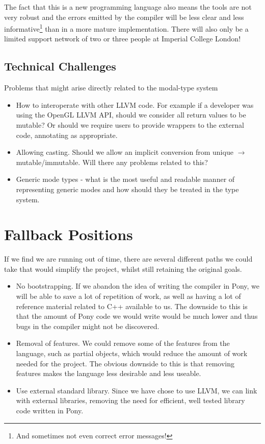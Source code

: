 \documentclass[pdftex,11pt,a4paper]{report}
\begin{document}
The fact that this is a new programming language also means the tools are not very robust and the errors emitted by the compiler will be less clear and less informative\footnote{And sometimes not even correct error messages!} than in a more mature implementation.
There will also only be a limited support network of two or three people at Imperial College London!

\subsection{Technical Challenges}

Problems that might arise directly related to the modal-type system
	\begin{itemize}
		\item How to interoperate with other LLVM code. For example if a developer was using the OpenGL LLVM API, should we consider all return values to be mutable?
			Or should we require users to provide wrappers to the external code, annotating as appropriate.
		\item Allowing casting. Should we allow an implicit conversion from unique $\to$ mutable/immutable.
			Will there any problems related to this?
		\item Generic mode types - what is the most useful and readable manner of representing generic modes and how should they be treated in the type system.
	\end{itemize}
	
\section{Fallback Positions}
If we find we are running out of time, there are several different paths we could take that would simplify the project, whilst still retaining the original goals.
\begin{itemize}[noitemsep]
\item No bootstrapping.
	If we abandon the idea of writing the compiler in Pony, we will be able to save a lot of repetition of work, as well as having a lot of reference material related to C++ available to us.
	The downside to this is that the amount of Pony code we would write would be much lower and thus bugs in the compiler might not be discovered.
\item Removal of features.
	We could remove some of the features from the language, such as partial objects, which would reduce the amount of work needed for the project.
	The obvious downside to this is that removing features makes the language less desirable and less useable.
\item Use external standard library.
	 Since we have chose to use LLVM, we can link with external libraries, removing the need for efficient, well tested library code written in Pony.
\end{itemize}
\end{document}
